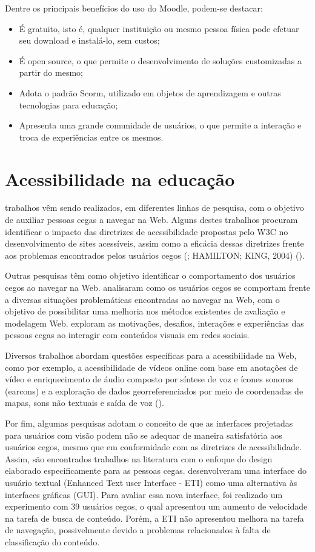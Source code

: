 \documentclass[12pt,journal,compsoc]{IEEEtran}
\begin{document}
Dentre os principais benefícios do uso do Moodle, podem-se destacar:
\begin{itemize}
  \item{É gratuito, isto é, qualquer instituição ou mesmo pessoa física pode efetuar seu download e instalá-lo, sem custos;}
  \item{É open source, o que permite o desenvolvimento de soluções customizadas a partir do mesmo;}
  \item{Adota o padrão Scorm, utilizado em objetos de aprendizagem e outras tecnologias para educação;}
  \item{Apresenta uma grande comunidade de usuários, o que permite a interação e troca de experiências entre os mesmos.}
\end{itemize}

\section{Acessibilidade na educação}
 trabalhos vêm sendo realizados, em diferentes linhas de pesquisa, com o objetivo de auxiliar pessoas cegas a 
navegar na Web. Alguns destes trabalhos procuram identificar o impacto das diretrizes de acessibilidade propostas pelo 
W3C no desenvolvimento de sites acessíveis, assim como a eficácia dessas diretrizes frente aos problemas encontrados 
pelos usuários cegos (\cite{4ce5a8d646ac449e98d079b8f6c3a7c5}; HAMILTON; KING, 2004) (\cite{Power2012}).

Outras pesquisas têm como objetivo identificar o comportamento dos usuários cegos ao navegar na Web. 
\cite{Vigo2013} analisaram como os usuários cegos se comportam frente a diversas situações problemáticas 
encontradas ao navegar na Web, com o objetivo de possibilitar uma melhoria nos métodos existentes de avaliação 
e modelagem Web. \cite{Voykinska2016} exploram as motivações, desafios, interações e experiências das 
pessoas cegas ao interagir com conteúdos visuais em redes sociais.

Diversos trabalhos abordam questões específicas para a acessibilidade na Web, como por exemplo, 
a acessibilidade de vídeos online com base em anotações de vídeo e enriquecimento de áudio composto por 
síntese de voz e ícones sonoros (earcons) \cite{Encelle2011} e a exploração de dados georreferenciados 
por meio de coordenadas de mapas, sons não textuais e saída de voz (\cite{Zhao2008}).

Por fim, algumas pesquisas adotam o conceito de que as interfaces projetadas para usuários com 
visão podem não se adequar de maneira satisfatória aos usuários cegos, mesmo que em conformidade 
com as diretrizes de acessibilidade. Assim, são encontrados trabalhos na literatura com o enfoque 
do design elaborado especificamente para as pessoas cegas. \cite{Press2008} desenvolveram uma 
interface do usuário textual (Enhanced Text user Interface - ETI) como uma alternativa 
às interfaces gráficas (GUI). Para avaliar essa nova interface, foi realizado um experimento com 39 
usuários cegos, o qual apresentou um aumento de velocidade na tarefa de busca de conteúdo. Porém, a 
ETI não apresentou melhora na tarefa de navegação, possivelmente devido a problemas relacionados à 
falta de classificação do conteúdo.
\end{document}
